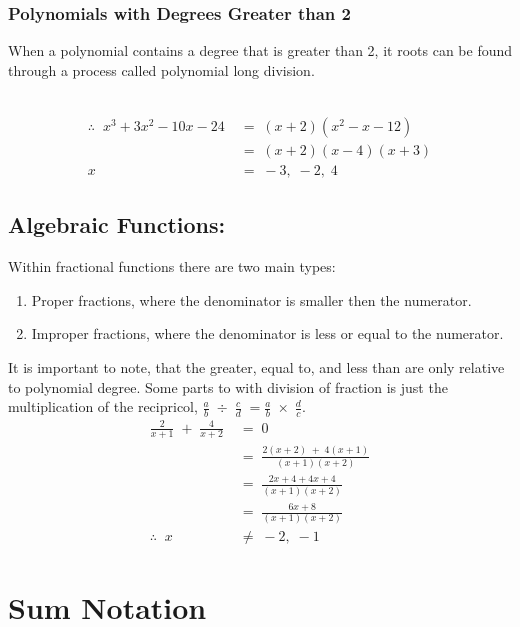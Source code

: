 \documentclass[a5paper]{article}
\begin{document}
	\subsubsection{Polynomials with Degrees Greater than 2}
	When a polynomial contains a degree that is greater than 2, it roots can be found through a process called polynomial long division.
	\medskip
	\begin{center}
		\\
		\smallskip
		\begin{align*}
			\therefore\;\;x^{3}+3x^{2}-10x-24\;&=\;(x+2)(x^{2}-x-12)\\
			&=\;(x+2)(x-4)(x+3)\\
			x\;&=\;-3,\;-2,\;4
		\end{align*}
	\end{center}

	\subsection{Algebraic Functions:}
	Within fractional functions there are two main types:
	\begin{enumerate}
		\item Proper fractions, where the denominator is smaller then the numerator.
		\item Improper fractions, where the denominator is less or equal to the numerator.
	\end{enumerate}
	It is important to note, that the greater, equal to, and less than are only relative to polynomial degree. Some parts to with division of fraction is just the multiplication of the recipricol, $\frac{a}{b}\;\div\;\frac{c}{d}\;=\frac{a}{b}\;\times\;\frac{d}{c}$.
	\begin{align*}
		\frac{2}{x+1}\;+\;\frac{4}{x+2}\;&=\;0\\
		&=\;\frac{2(x+2)\;+\;4(x+1)}{(x+1)(x+2)}\\
		&=\;\frac{2x+4+4x+4}{(x+1)(x+2)}\\
		&=\;\frac{6x+8}{(x+1)(x+2)}\\
		\therefore\;\;x&\not =\;-2,\;-1
	\end{align*}

	\pagebreak

	\section{Sum Notation}
\end{document}

